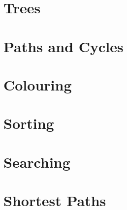 \section{Trees}

\section{Paths and Cycles}

\section{Colouring}

\section{Sorting}

\section{Searching}

\section{Shortest Paths}
